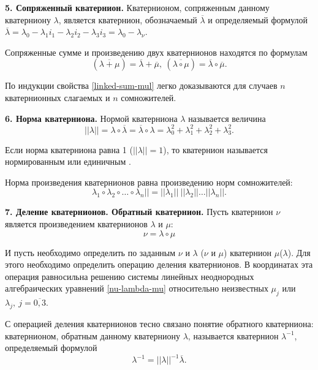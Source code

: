 \documentclass[14pt]{extreport}
\begin{document}
\textbf{5. Сопряженный кватернион.} Кватернионом, сопряженным данному кватерниону $\lambda$, является кватернион, обозначаемый $\overline{\lambda}$ и определяемый формулой $\overline{\lambda}=\lambda_{0}-\lambda_{1}i_{1}-\lambda_{2}i_{2}-\lambda_{3}i_{3}=\lambda_{0}-\lambda_{\nu}$.

Сопряженные сумме и произведению двух кватернионов находятся
по формулам
\begin{equation}
\label{linked-sum-mul}
(\overline{\lambda+\mu})=\overline{\lambda}+\overline{\mu},\ (\overline{\lambda\circ\mu})=\overline{\lambda}\circ\overline{\mu}.
\end{equation}

По индукции свойства \eqref{linked-sum-mul} легко доказываются для случаев $n$ кватернионных слагаемых и $n$ сомножителей.

\textbf{6. Норма кватерниона.} Нормой кватерниона $\lambda$ называется величина 
\begin{equation}
||\lambda|| = \lambda \circ \overline{\lambda} = \overline{\lambda} \circ \lambda = \lambda_{0}^{2}+\lambda_{1}^{2}+\lambda_{2}^{2}+\lambda_{3}^{2}.
\end{equation}

Если норма кватерниона равна 1 ($||\lambda|| = 1$), то кватернион называется нормированным или единичным \cite{demidovich}.

Норма произведения кватернионов равна произведению норм сомножителей: 
\begin{equation}
\lambda_{1} \circ \lambda_{2} \circ \dots \circ \lambda_{n}|| = ||\lambda_{1}||\ ||\lambda_{2}|| \dots ||\lambda_{n}||.
\end{equation}

\textbf{7. Деление кватернионов. Обратный кватернион.} Пусть кватернион $\nu$ является произведением кватернионов $\lambda$ и $\mu$:
\begin{equation}
\label{res-nu-mul-lambda-mu}
\nu=\lambda \circ \mu
\end{equation}

И пусть необходимо определить по заданным $\nu$ и $\lambda$ ($\nu$ и $\mu$) кватернион $\mu$($\lambda$). Для этого необходимо определить операцию деления кватернионов. В координатах эта операция равносильна решению системы линейных неоднородных алгебраических уравнений \eqref{nu-lambda-mu} относительно неизвестных $\mu_{j}$ или $\lambda_{j},\ j=\overline{0,3}.$

С операцией деления кватернионов тесно связано понятие обратного кватерниона: кватернионом, обратным данному кватерниону $\lambda$, называется кватернион $\lambda^{-1}$, определяемый формулой
\begin{equation}
\lambda^{-1}=||\lambda||^{-1}\overline{\lambda}.
\end{equation}
\end{document}
